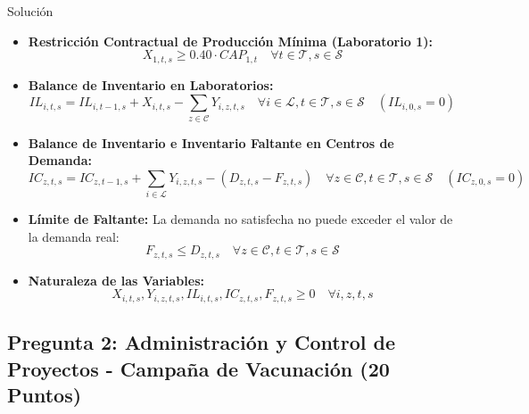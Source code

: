 \documentclass[11pt, a4paper]{article}
\begin{document}
\begin{ejercicio}{Solución}
\begin{itemize}
    \item \textbf{Restricción Contractual de Producción Mínima (Laboratorio 1):}
    \begin{equation}
      X_{1,t,s} \ge 0.40 \cdot CAP_{1,t} \quad \forall t \in \mathcal{T}, s \in \mathcal{S}
    \end{equation}

    \item \textbf{Balance de Inventario en Laboratorios:}
    \begin{equation}
      IL_{i,t,s} = IL_{i,t-1,s} + X_{i,t,s} - \sum_{z \in \mathcal{C}} Y_{i,z,t,s} \quad \forall i \in \mathcal{L}, t \in \mathcal{T}, s \in \mathcal{S} \quad (IL_{i,0,s} = 0)
    \end{equation}

    \item \textbf{Balance de Inventario e Inventario Faltante en Centros de Demanda:}
    \begin{equation}
      IC_{z,t,s} = IC_{z,t-1,s} + \sum_{i \in \mathcal{L}} Y_{i,z,t,s} - (D_{z,t,s} - F_{z,t,s}) \quad \forall z \in \mathcal{C}, t \in \mathcal{T}, s \in \mathcal{S} \quad (IC_{z,0,s} = 0)
    \end{equation}

    \item \textbf{Límite de Faltante:}
    La demanda no satisfecha no puede exceder el valor de la demanda real:
    \begin{equation}
      F_{z,t,s} \le D_{z,t,s} \quad \forall z \in \mathcal{C}, t \in \mathcal{T}, s \in \mathcal{S}
    \end{equation}

    \item \textbf{Naturaleza de las Variables:}
    \begin{equation}
      X_{i,t,s}, Y_{i,z,t,s}, IL_{i,t,s}, IC_{z,t,s}, F_{z,t,s} \ge 0 \quad \forall i, z, t, s
    \end{equation}
  \end{itemize}

\end{ejercicio}

\newpage

\subsection*{Pregunta 2: Administración y Control de Proyectos - Campaña de Vacunación (20 Puntos)}
\end{document}
